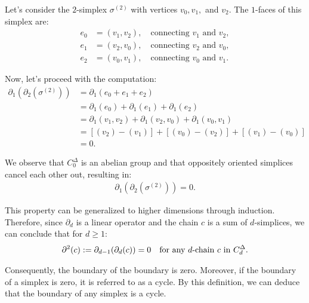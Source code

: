 \begin{example}
	Let's consider the \(2\)-simplex \( \sigma^{(2)} \) with vertices \( v_{0}, v_{1}, \) and \( v_{2} \). The \( 1 \)-faces of this simplex are:
	\begin{align}
		e_{0} & = (v_{1}, v_{2}), \quad \text{connecting } v_{1} \text{ and } v_{2}, \\
		e_{1} & = (v_{2}, v_{0}), \quad \text{connecting } v_{2} \text{ and } v_{0}, \\
		e_{2} & = (v_{0}, v_{1}), \quad \text{connecting } v_{0} \text{ and } v_{1}. 
	\end{align}
				
	Now, let's proceed with the computation:
	\begin{align}
		\partial_1(\partial_2(\sigma^{(2)})) & = \partial_1(e_{0} + e_{1} + e_{2})                                          \\
		                                 & = \partial_1(e_{0}) + \partial_1(e_{1}) + \partial_1(e_{2})                      \\
		                                 & = \partial_1(v_{1}, v_{2}) + \partial_1(v_{2}, v_{0}) + \partial_1(v_{0}, v_{1}) \\
		                                 & = [(v_{2}) - (v_{1})] + [(v_{0}) - (v_{2})] + [(v_{1}) - (v_{0})]          \\
		                                 & = 0.                                                                       
	\end{align}
				
	We observe that \( C^{\Delta}_{0} \) is an abelian group and that oppositely oriented simplices cancel each other out, resulting in:
	\begin{align}
		\partial_{1}(\partial_2(\sigma^{(2)})) = 0. 
	\end{align}
				
	This property can be generalized to higher dimensions through induction. Therefore, since \( \partial_d \) is a linear operator and the chain \( c \) is a sum of \( d \)-simplices, we can conclude that for $d \geq 1$:
	\begin{align}
		\partial^{2}(c) := \partial_{d-1}(\partial_{d}(c)) = 0 \quad \text{for any \( d \)-chain \( c \) in } C^{\Delta}_{d}. 
	\end{align}
				
	Consequently, the boundary of the boundary is zero. Moreover, if the boundary of a simplex is zero, it is referred to as a cycle. By this definition, we can deduce that the boundary of any simplex is a cycle.
\end{example}

